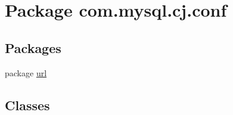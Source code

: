 \hypertarget{namespacecom_1_1mysql_1_1cj_1_1conf}{}\section{Package com.\+mysql.\+cj.\+conf}
\label{namespacecom_1_1mysql_1_1cj_1_1conf}
\subsection*{Packages}
\begin{DoxyCompactItemize}
\item 
package \mbox{\hyperlink{namespacecom_1_1mysql_1_1cj_1_1conf_1_1url}{url}}
\end{DoxyCompactItemize}
\subsection*{Classes}
